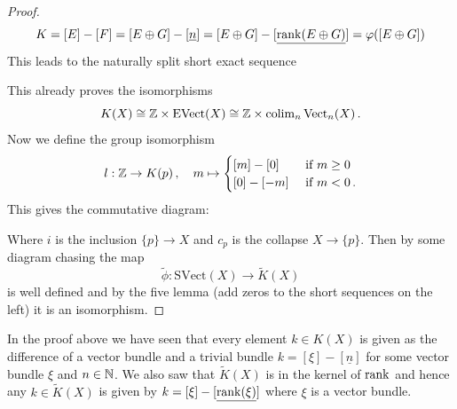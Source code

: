 \begin{proof}
	\begin{equation*}
		K=[E]-[F]=[E \oplus G]-[\underline{n}]=[E\oplus G]-[\underline{\operatorname{\mathrm{rank}}(E\oplus G)}]= \varphi([E \oplus G])
	\end{equation*}
	This leads to the naturally split short exact sequence
\begin{center}
\end{center}
This already proves the isomorphisms \begin{equation*}
		K(X) \cong \mathbb{Z}\times \mathrm{EVect}(X) \cong\mathbb{Z} \times \operatorname{\mathrm{colim}}_n \operatorname{\mathrm{Vect}}_n(X)\,.
	\end{equation*}
Now we define the group isomorphism 
\begin{equation*}
	l:\mathbb{Z} \to K(p)\,,\quad m\mapsto \begin{cases}
			[m]-[0]& \text{ if }m\geq 0\\
			[0]-[-m]& \text{ if }m<0\,.
		\end{cases}
\end{equation*}
This gives the commutative diagram:
\begin{center}
\end{center}
Where $i$ is the inclusion $\{p\}\to X$ and $c_p$ is the collapse $X\to \{p\}$. Then by some diagram chasing the map 
\begin{equation*}
	\tilde{\phi}: \mathrm{SVect}(X)\to \tilde{K}(X) 
\end{equation*} is well defined and by the five lemma (add zeros to the short sequences on the left) it is an isomorphism.
\end{proof} 
\begin{remark}\label{rem:kTheo-elementsInReducedKtheoryAreGivenByEMionusN}
	In the proof above we have seen that every element $k\in K(X)$ is given as the difference of a vector bundle and a trivial bundle $k=[\xi]-[\underline{n}]$ for some vector bundle $\xi$ and $n\in \mathbb{N}$. We also saw that 
	$\tilde{K}(X)$ is in the kernel of $\operatorname{\mathrm{rank}}$ and hence any $k\in \tilde{K}(X)$ is given by $k=[\xi]-[\underline{\operatorname{\mathrm{rank}}(\xi)}]$ where $\xi$ is a vector bundle.
\end{remark}
